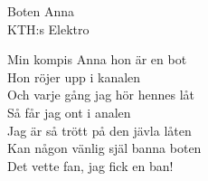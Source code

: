 
  {\Large Boten Anna}\\{\tiny  KTH:s Elektro}
  \begin{vers}
Min kompis Anna hon är en bot \\
Hon röjer upp i kanalen \\
Och varje gång jag hör hennes låt \\
Så får jag ont i analen\\ 
Jag är så trött på den jävla låten \\
Kan någon vänlig själ banna boten \\
Det vette fan, jag fick en ban! \\
\end{vers}